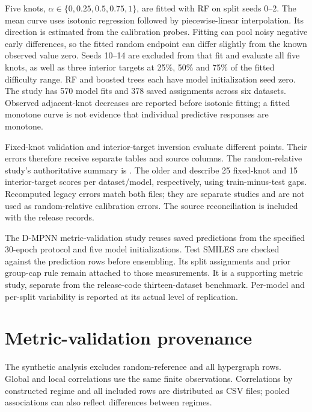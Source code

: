 Five knots, $\alpha\in\{0,0.25,0.5,0.75,1\}$, are fitted with RF on split seeds
0--2. The mean curve uses isotonic regression followed by piecewise-linear
interpolation. Its direction is estimated from the calibration probes.
Fitting can pool noisy negative early differences, so the fitted random
endpoint can differ slightly from the known observed value zero. Seeds 10--14
are excluded from that fit and evaluate all five knots, as well as three
interior targets at 25\%, 50\% and 75\% of the fitted difficulty range. RF and
boosted trees each have model initialization seed zero. The study has 570 model
fits and 378 saved assignments across six datasets. Observed adjacent-knot
decreases are reported before isotonic fitting; a fitted monotone curve is not
evidence that individual predictive responses are monotone.

Fixed-knot validation and interior-target inversion evaluate different points.
Their errors therefore receive separate tables and source columns. The
random-relative study's authoritative summary is
. The older
 and
 describe 25 fixed-knot and 15 interior-target
scores per dataset/model, respectively, using train-minus-test gaps. Recomputed
legacy errors match both files; they are separate studies and are not used as
random-relative calibration errors. The source reconciliation is included with
the release records.


The D-MPNN metric-validation study reuses saved predictions from the specified
30-epoch protocol and five model initializations. Test SMILES are checked against
the prediction rows before ensembling. Its split assignments and prior group-cap
rule remain attached to those measurements. It is a supporting metric study,
separate from the release-code thirteen-dataset benchmark. Per-model and
per-split variability is reported at its actual level of replication.

\section{Metric-validation provenance}

The synthetic analysis excludes random-reference and all hypergraph rows.
Global and local correlations use the same finite observations. Correlations
by constructed regime and all included rows are distributed as CSV files;
pooled associations can also reflect differences between regimes.

